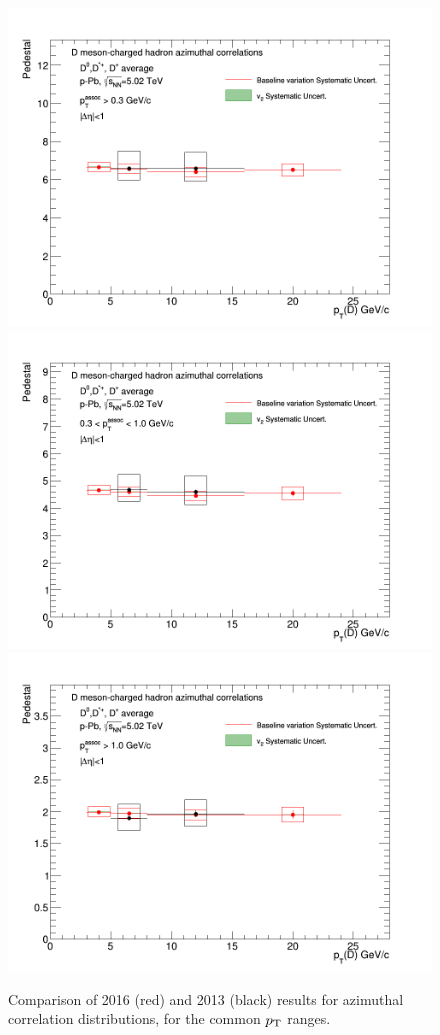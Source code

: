 \begin{figure}[!htbp]
{\includegraphics[width=0.31\linewidth]{figures/Cfr2013vs2016/Pedestal_Cfr_2013_2016_Thr03to99.png}}
{\includegraphics[width=0.31\linewidth]{figures/Cfr2013vs2016/Pedestal_Cfr_2013_2016_Thr03to1.png}}
{\includegraphics[width=0.31\linewidth]{figures/Cfr2013vs2016/Pedestal_Cfr_2013_2016_Thr1to99.png}}
\caption{Comparison of 2016 (red) and 2013 (black) results for azimuthal correlation distributions, for the common $p_{\rm T}$ ranges.}
\label{fig:CfrObs}
\end{figure} 
